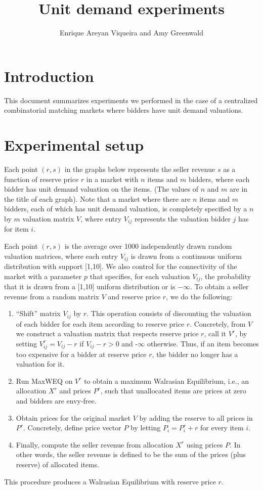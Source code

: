 \documentclass[letterpaper,12pt]{article}
\title{Unit demand experiments}
\author{Enrique Areyan Viqueira and Amy Greenwald}
\theoremstyle{plain}
\theoremstyle{definition}
\theoremstyle{remark}
\begin{document}
\maketitle

\section{Introduction}

This document summarizes experiments we performed in the case of a centralized combinatorial matching markets
where bidders have unit demand valuations.

\section{Experimental setup}

Each point $(r,s)$ in the graphs below represents the seller revenue $s$ as a function of reserve price $r$ in a market with $n$ items and $m$ bidders, 
where each bidder has unit demand valuation on the items. (The values of $n$ and $m$ are in the title of each graph). 
Note that a market where there are $n$ items and $m$ bidders, each of which has unit demand valuation, is completely specified 
by a $n$ by $m$ valuation matrix $V$, where entry $V_{ij}$ represents the valuation bidder $j$ has for item $i$. 

Each point $(r,s)$ is the average over 1000 independently drawn random valuation matrices, where each entry $V_{ij}$ is drawn from a continuous uniform distribution 
with support [1,10]. We also control for the connectivity of the market with a parameter $p$ that specifies, for each valuation $V_{ij}$, the probability that it is
drawn from a [1,10] uniform distribution or is $-\infty$.
To obtain a seller revenue from a random matrix $V$ and reserve price $r$, we do the following:
\begin{enumerate}
 \item ``Shift'' matrix $V_{ij}$ by $r$. This operation consists of discounting the valuation of each bidder for each item according to reserve price $r$. 
	Concretely, from $V$ we construct a valuation matrix that respects reserve price $r$, call it $V^r$, by setting $V^r_{ij} = V_{ij} - r$ if $V_{ij} - r>0$
	and -$\infty$ otherwise. Thus, if an item becomes too expensive for a bidder at reserve price $r$, the bidder no longer has a valuation for it.
 \item Run MaxWEQ on $V^r$ to obtain a maximum Walrasian Equilibrium, i.e., an allocation $X^r$ and prices $P^r$, such that unallocated items are prices at zero 
	and bidders are envy-free.
 \item Obtain prices for the original market $V$ by adding the reserve to all prices in $P^r$. Concretely, define price vector $P$ by letting $P_i = P^r_i + r$ for every item $i$.
 \item Finally, compute the seller revenue from allocation $X^r$ using prices $P$. In other words, the seller revenue is defined to be the sum of the prices (plus reserve) of allocated items.
\end{enumerate}
This procedure produces a Walrasian Equilibrium with reserve price $r$.
\end{document}
